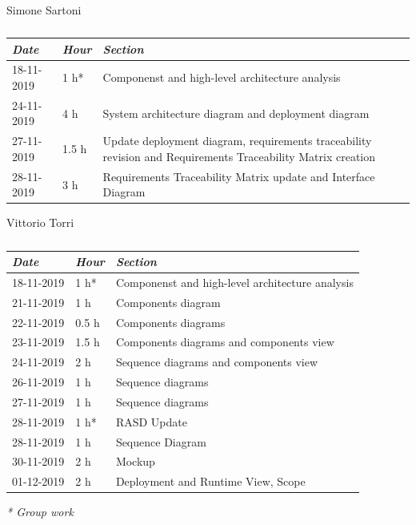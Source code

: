 \documentclass[a4paper]{report}
\begin{document}
\vspace*{1 cm}
\begin{table}[H]
\centering
Simone Sartoni \\
\begin{tabular}{p{2cm}p{1.5cm}p{7cm}}
\toprule
\textit{Date} & \textit{Hour} & \textit{Section} \\ \midrule
18-11-2019 & 1 h* & Componenst and high-level architecture analysis \\ \midrule
24-11-2019 & 4 h &  System architecture diagram and deployment diagram\\ \midrule
27-11-2019 & 1.5 h & Update deployment diagram, requirements traceability revision and Requirements Traceability Matrix creation \\ \midrule
28-11-2019 & 3 h & Requirements Traceability Matrix update and Interface Diagram \\ \midrule

\bottomrule
\end{tabular}
\caption[Simone Sartoni's effort table]{}
\end{table}
\vspace*{1 cm}
\begin{table}[H]
\centering
Vittorio Torri \\
\begin{tabular}{p{2cm}p{1.5cm}p{7cm}}
\toprule
\textit{Date} & \textit{Hour} & \textit{Section} \\ \midrule
18-11-2019 & 1 h* & Componenst and high-level architecture analysis \\ \midrule
21-11-2019 & 1 h  & Components diagram \\ \midrule
22-11-2019 & 0.5 h & Components diagrams \\ \midrule
23-11-2019 & 1.5 h & Components diagrams and components view\\ \midrule
24-11-2019 & 2 h & Sequence diagrams and components view \\ \midrule
26-11-2019 & 1 h & Sequence diagrams \\ \midrule
27-11-2019 & 1 h & Sequence diagrams \\ \midrule
28-11-2019 & 1 h* & RASD Update \\ \midrule
28-11-2019 & 1 h & Sequence Diagram \\ \midrule
30-11-2019 & 2 h & Mockup \\ \midrule
01-12-2019 & 2 h & Deployment and Runtime View, Scope \\ \midrule
\bottomrule
\end{tabular}
\caption[Vittorio Torri's effort table]{}
\end{table}
\textit{* Group work}
\end{document}
